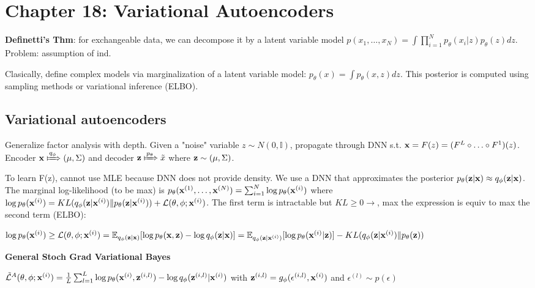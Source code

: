 \section*{Chapter 18: Variational Autoencoders}
\textbf{Definetti's Thm}: for exchangeable data, we can decompose it by a latent variable model $p(x_1, \hdots, x_N) = \int\prod_{i=1}^{N}p_\theta(x_i|z)p_\theta(z)dz$. Problem: assumption of ind.

Clasically, define complex models via marginalization of a latent variable model: $p_\theta(x) = \int p_\theta(x,z)dz$. This posterior is computed using sampling methods or variational inference (ELBO).

\subsection*{Variational autoencoders}
Generalize factor analysis with depth. Given a "noise" variable $z \sim N(0, \mathbb I)$, propagate through DNN s.t. $\mathbf{x} = F(z) = (F^L \circ \hdots \circ F^1)(z)$. Encoder $\x \xMapsto[]{q_\phi} (\mu, \Sigma)$ and decoder $\z \xMapsto[]{p_\theta} \tilde{x}$ where $\mathbf{z}\sim (\mu, \Sigma)$.

To learn F(z), cannot use MLE because DNN does not provide density. We use a DNN that approximates the posterior $p_\theta(\mathbf{z} | \mathbf{x}) \approx q_\phi(\mathbf{z} | \mathbf{x})$. The marginal log-likelihood (to be max) is $p_\theta(\mathbf{x}^{(1)}, \hdots, \mathbf{x}^{(N)}) = \sum_{i=1}^N \log p_\theta(\mathbf{x}^{(i)})$ where $\log p_\theta(\mathbf{x}^{(i)}) = KL(q_\phi(\mathbf{z}|\mathbf{x}^{(i)}) \| p_\theta(\mathbf{z}|\mathbf{x}^{(i)})) + \mathcal L(\theta, \phi; \mathbf{x}^{(i)})$. The first term is intractable but 
$KL \geq 0 \to$, max the expression is equiv to max the second term (ELBO):

$\log p_\theta(\mathbf{x}^{(i)}) \geq \mathcal L(\theta, \phi; \mathbf{x}^{(i)}) = \mathbb{E}_{q_\phi(\mathbf{z}|\mathbf{x})}[\log p_\theta(\mathbf{x}, \mathbf{z}) - \log q_\phi(\mathbf{z}|\mathbf{x})] = \mathbb{E}_{q_\phi(\mathbf{z}|\mathbf{x}^{(i)})}[\log p_\theta(\mathbf{x}^{(i)} | \mathbf{z})] - KL(q_\phi(\mathbf z | \mathbf{x}^{(i)}) \| p_\theta(\mathbf z))$

\textbf{General Stoch Grad Variational Bayes}

$\mathcal{\tilde{L}}^A(\theta, \phi; \mathbf{x}^{(i)}) = \frac{1}{L}\sum_{l=1}^L\log p_\theta(\mathbf{x}^{(i)}, \mathbf{z}^{(i, l)}) - \log q_\phi(\mathbf{z}^{(i,l)}|\mathbf{x}^{(i)})$ with $\mathbf{z}^{(i,l)} = g_\phi(\epsilon^{(i,l)}, \mathbf{x}^{(i)})$ and $\epsilon^{(l)} \sim p(\epsilon)$